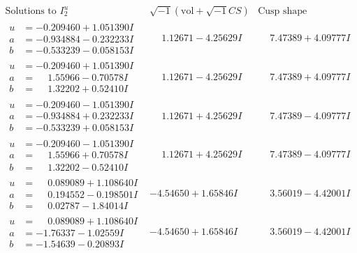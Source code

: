 \documentclass[1p]{elsarticle_modified}
\theoremstyle{definition}
\newcommand{\I}{\sqrt{-1}}
\begin{document}
$$\begin{array}{c|c|c}  
\text{Solutions to }I^u_{2}& \I (\text{vol} + \sqrt{-1}CS) & \text{Cusp shape}\\
 \hline 
\begin{aligned}
u &= -0.209460 + 1.051390 I \\
a &= -0.934884 - 0.232233 I \\
b &= -0.533239 - 0.058153 I\end{aligned}
 & \phantom{-}1.12671 - 4.25629 I & \phantom{-}7.47389 + 4.09777 I \\ \hline\begin{aligned}
u &= -0.209460 + 1.051390 I \\
a &= \phantom{-}1.55966 - 0.70578 I \\
b &= \phantom{-}1.32202 + 0.52410 I\end{aligned}
 & \phantom{-}1.12671 - 4.25629 I & \phantom{-}7.47389 + 4.09777 I \\ \hline\begin{aligned}
u &= -0.209460 - 1.051390 I \\
a &= -0.934884 + 0.232233 I \\
b &= -0.533239 + 0.058153 I\end{aligned}
 & \phantom{-}1.12671 + 4.25629 I & \phantom{-}7.47389 - 4.09777 I \\ \hline\begin{aligned}
u &= -0.209460 - 1.051390 I \\
a &= \phantom{-}1.55966 + 0.70578 I \\
b &= \phantom{-}1.32202 - 0.52410 I\end{aligned}
 & \phantom{-}1.12671 + 4.25629 I & \phantom{-}7.47389 - 4.09777 I \\ \hline\begin{aligned}
u &= \phantom{-}0.089089 + 1.108640 I \\
a &= \phantom{-}0.194552 - 0.198501 I \\
b &= \phantom{-}0.02787 - 1.84014 I\end{aligned}
 & -4.54650 + 1.65846 I & \phantom{-}3.56019 - 4.42001 I \\ \hline\begin{aligned}
u &= \phantom{-}0.089089 + 1.108640 I \\
a &= -1.76337 - 1.02559 I \\
b &= -1.54639 - 0.20893 I\end{aligned}
 & -4.54650 + 1.65846 I & \phantom{-}3.56019 - 4.42001 I \\ \hline\begin{aligned}

\end{aligned}
\end{array}$$
\end{document}
